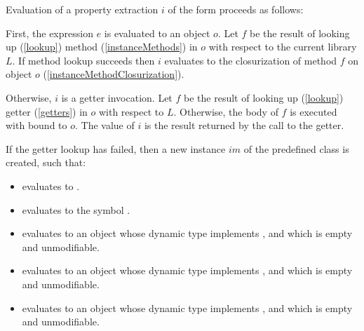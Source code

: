 \documentclass[makeidx]{article}
\begin{document}
{

\LMHash{}%
Evaluation of a property extraction $i$ of the form 
proceeds as follows:

\LMHash{}%
First, the expression $e$ is evaluated to an object $o$.
Let $f$ be the result of looking up (\ref{lookup}) method
(\ref{instanceMethods})
\id{} in $o$ with respect to the current library $L$.
If method lookup succeeds then $i$ evaluates to
the closurization of method $f$ on object $o$
(\ref{instanceMethodClosurization}).


\LMHash{}%
Otherwise, $i$ is a getter invocation.
Let $f$ be the result of looking up (\ref{lookup}) getter
(\ref{getters})
\id{} in $o$ with respect to $L$.
Otherwise, the body of $f$ is executed with \THIS{} bound to $o$.
The value of $i$ is the result returned by the call to the getter.

\LMHash{}%
If the getter lookup has failed,
then a new instance $im$ of the predefined class  is created,
such that:
\begin{itemize}
\item {} evaluates to \TRUE.
\item {} evaluates to the symbol .
\item {} evaluates to an object
  whose dynamic type implements ,
  and which is empty and unmodifiable.
\item {} evaluates to an object
  whose dynamic type implements ,
  and which is empty and unmodifiable.
\item {} evaluates to an object
  whose dynamic type implements ,
  and which is empty and unmodifiable.
\end{itemize}

}
\end{document}
